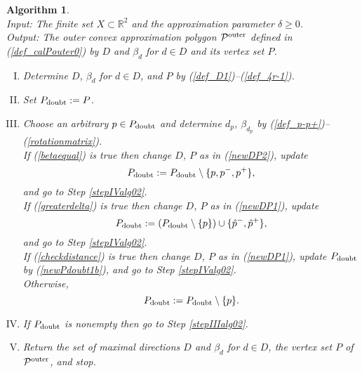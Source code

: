 \documentclass[12pt]{article}
\newtheorem{algorithm}{Algorithm}
\def\R{\mathbb{R}}
\begin{document}
\begin{algorithm}\label{alg02}  \rm \ \\
\emph{Input:} The finite set $X \subset \R^2$ and the approximation parameter $\delta \geq 0$. \\
\emph{Output:} The outer convex approximation polygon ${\cal P}^{\rm outer}$ defined in (\ref{def_calPouter0}) by $D$ and $\beta_d$ for $d \in D$ and its vertex set $P$.
\begin{enumerate}[I.]
\item\label{stepIalg02} 
Determine $D$, $\beta_d$ for $d \in D$, and $P$ by (\ref{def_D1})--(\ref{def_4r-1}).

\item\label{stepIIalg02} Set $P_{\rm doubt} := P$.

\item\label{stepIIIalg02} 
Choose an arbitrary $p \in P_{\rm doubt}$ and determine $d_p$, $\beta_{d_p}$ by (\ref{def_p-p+})--(\ref{rotationmatrix}). \\
If (\ref{betaequal}) is true then change $D$, $P$ as in (\ref{newDP2}), update 
\begin{equation}\label{newPdoubt2b}
P_{\rm doubt} := P_{\rm doubt} \setminus \{p, p^-, p^+\},
\end{equation}
and go to Step \ref{stepIValg02}.\\
If (\ref{greaterdelta}) is true then change $D$, $P$ as in (\ref{newDP1}), update 
\begin{equation}\label{newPdoubt1b}
P_{\rm doubt} := (P_{\rm doubt} \setminus \{p\}) \cup \{\hat p^-, \hat p^+\},
\end{equation}
and go to Step \ref{stepIValg02}.\\
If (\ref{checkdistance}) is true then change $D$, $P$ as in (\ref{newDP1}), update $P_{\rm doubt}$ by (\ref{newPdoubt1b}), and go to Step \ref{stepIValg02}.\\
Otherwise, 
\begin{equation}\label{newPdoubt3b}
P_{\rm doubt} := P_{\rm doubt} \setminus \{p\}.
\end{equation}

\item\label{stepIValg02} 
If $P_{\rm doubt}$ is nonempty then go to Step \ref{stepIIIalg02}.

\item
Return the set of maximal directions $D$ and $\beta_d$ for $d \in D$, the vertex set $P$ of ${\cal P}^{\rm outer}$, and stop.
\end{enumerate}
\end{algorithm}
\end{document}
